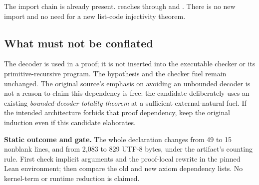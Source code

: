 The import chain is already present.  reaches
 through  and
. There is no new import and no need for a
new list-code injectivity theorem.

\subsection{What must not be conflated}

The decoder is used in a  proof; it is not inserted into the
executable checker or its primitive-recursive program. The hypothesis
 and the checker fuel remain unchanged.
The original source's emphasis on avoiding an unbounded decoder is not a
reason to claim this dependency is free: the candidate deliberately uses
an existing \emph{bounded-decoder totality theorem} at a sufficient
external-natural fuel. If the intended architecture forbids that proof
dependency, keep the original induction even if this candidate elaborates.

\textbf{Static outcome and gate.} The whole declaration changes from 49 to
15 nonblank lines, and from 2,083 to 829 UTF-8 bytes, under the artifact's
counting rule. First check implicit arguments and the proof-local
 rewrite in the pinned Lean environment; then compare the old and
new axiom dependency lists. No kernel-term or runtime reduction is claimed.
